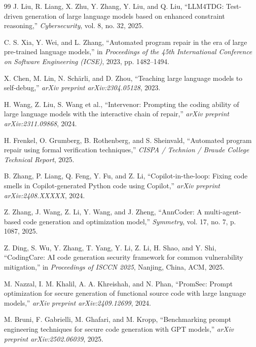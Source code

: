 \documentclass[11pt,a4paper]{article}
\begin{document}
\begin{thebibliography}{99}
J. Liu, R. Liang, X. Zhu, Y. Zhang, Y. Liu, and Q. Liu, ``LLM4TDG: Test-driven generation of large language models based on enhanced constraint reasoning,'' \textit{Cybersecurity}, vol. 8, no. 32, 2025.

C. S. Xia, Y. Wei, and L. Zhang, ``Automated program repair in the era of large pre-trained language models,'' in \textit{Proceedings of the 45th International Conference on Software Engineering (ICSE)}, 2023, pp. 1482--1494.

X. Chen, M. Lin, N. Sch{\"a}rli, and D. Zhou, ``Teaching large language models to self-debug,'' \textit{arXiv preprint arXiv:2304.05128}, 2023.

H. Wang, Z. Liu, S. Wang et al., ``Intervenor: Prompting the coding ability of large language models with the interactive chain of repair,'' \textit{arXiv preprint arXiv:2311.09868}, 2024.

H. Frenkel, O. Grumberg, B. Rothenberg, and S. Sheinvald, ``Automated program repair using formal verification techniques,'' \textit{CISPA / Technion / Braude College Technical Report}, 2025.

B. Zhang, P. Liang, Q. Feng, Y. Fu, and Z. Li, ``Copilot-in-the-loop: Fixing code smells in Copilot-generated Python code using Copilot,'' \textit{arXiv preprint arXiv:2408.XXXXX}, 2024.

Z. Zhang, J. Wang, Z. Li, Y. Wang, and J. Zheng, ``AnnCoder: A multi-agent-based code generation and optimization model,'' \textit{Symmetry}, vol. 17, no. 7, p. 1087, 2025.

Z. Ding, S. Wu, Y. Zhang, T. Yang, Y. Li, Z. Li, H. Shao, and Y. Shi, ``CodingCare: AI code generation security framework for common vulnerability mitigation,'' in \textit{Proceedings of ISCCN 2025}, Nanjing, China, ACM, 2025.

M. Nazzal, I. M. Khalil, A. A. Khreishah, and N. Phan, ``PromSec: Prompt optimization for secure generation of functional source code with large language models,'' \textit{arXiv preprint arXiv:2409.12699}, 2024.

M. Bruni, F. Gabrielli, M. Ghafari, and M. Kropp, ``Benchmarking prompt engineering techniques for secure code generation with GPT models,'' \textit{arXiv preprint arXiv:2502.06039}, 2025.


\end{thebibliography}
\end{document}
